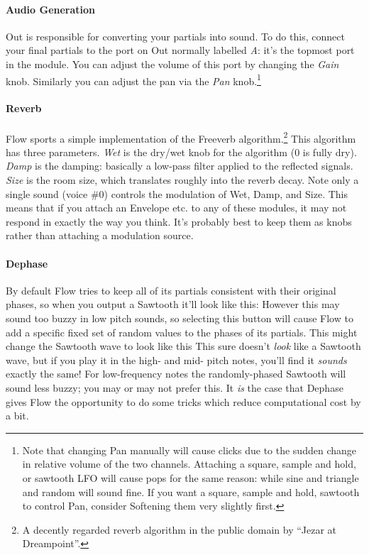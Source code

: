 \documentclass{article}
\begin{document}
\paragraph{Audio Generation}  Out is responsible for converting your partials into sound.  To do this, connect your final partials to the port on Out normally labelled {\it A}: it's the topmost port in the module.  You can adjust the volume of this port by changing the {\it Gain} knob.  Similarly you can adjust the pan via the {\it Pan} knob.\footnote{Note that changing Pan manually will cause clicks due to the sudden change in relative volume of the two channels.  Attaching a square, sample and hold, or sawtooth LFO will cause pops for the same reason: while sine and triangle and random will sound fine.  If you want a square, sample and hold,  sawtooth to control Pan, consider Softening them very slightly first.}

\paragraph{Reverb} Flow sports a simple implementation of the Freeverb algorithm.\footnote{A decently regarded reverb algorithm in the public domain by ``Jezar at Dreampoint''.}  This algorithm has three parameters.  {\it Wet} is the dry/wet knob for the algorithm (0 is fully dry).  {\it Damp} is the damping: basically a low-pass filter applied to the reflected signals.  {\it Size} is the room size, which translates roughly into the reverb decay.  Note only a single sound (voice \#0) controls the modulation of Wet, Damp, and Size.  This means that if you attach an Envelope etc. to any of these modules, it may not respond in exactly the way you think.  It's probably best to keep them as knobs rather than attaching a modulation source.

\paragraph{Dephase} By default Flow tries to keep all of its partials consistent with their original phases, so when you output a Sawtooth it'll look like this:  \quad However this may sound too buzzy in low pitch sounds, so selecting this button will cause Flow to add a specific fixed set of random values to the phases of its partials.  This might change the Sawtooth wave to look like this \quad This sure doesn't {\it look} like a Sawtooth wave, but if you play it in the high- and mid- pitch notes, you'll find it {\it sounds} exactly the same!  For low-frequency notes the randomly-phased Sawtooth will sound less buzzy; you may or may not prefer this.  It {\it is} the case that Dephase gives Flow the opportunity to do some tricks which reduce computational cost by a bit.
\end{document}
